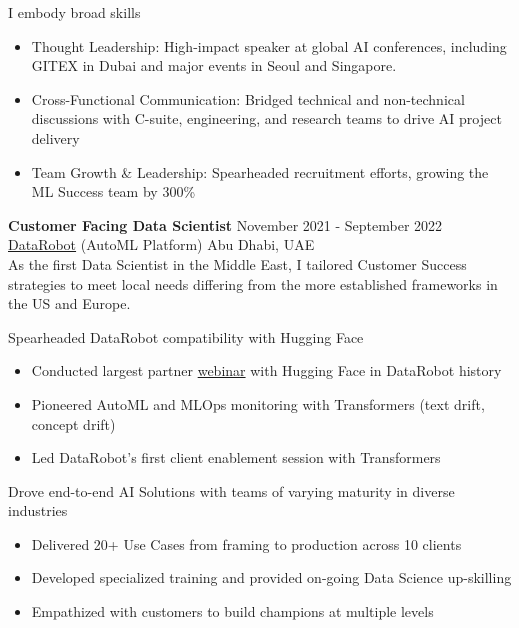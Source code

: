 \documentclass[margin, line]{res} %
\begin{document}
\begin{resume}
I embody broad skills
\begin{itemize} \itemsep -2pt
\item Thought Leadership: High-impact speaker at global AI conferences, including GITEX in Dubai and major events in Seoul and Singapore.
\item Cross-Functional Communication: Bridged technical and non-technical discussions with C-suite, engineering, and research teams to drive AI project delivery
\item Team Growth \& Leadership: Spearheaded recruitment efforts, growing the ML Success team by 300\%
\end{itemize}

{\textbf{Customer Facing Data Scientist}} \hfill November 2021 - September 2022\\
\href{https://www.datarobot.com/}{DataRobot} (AutoML Platform) \hfill Abu Dhabi, UAE\\
As the first Data Scientist in the Middle East, I tailored Customer Success strategies to meet local needs differing from the more established frameworks in the US and Europe.

Spearheaded DataRobot compatibility with Hugging Face
\begin{itemize} \itemsep -2pt
\item Conducted largest partner \href{https://www.datarobot.com/webinars/getting-started-with-transformers-and-mlops/}{webinar} with Hugging Face in DataRobot history
\item Pioneered AutoML and MLOps monitoring with Transformers (text drift, concept drift)
\item Led DataRobot's first client enablement session with Transformers
\end{itemize}

Drove end-to-end AI Solutions with teams of varying maturity in diverse industries
\begin{itemize} \itemsep -2pt %
\item Delivered 20+ Use Cases from framing to production across 10 clients
\item Developed specialized training and provided on-going Data Science up-skilling
\item Empathized with customers to build champions at multiple levels
\end{itemize}


\end{resume}
\end{document}
